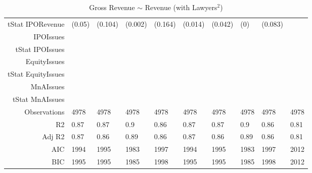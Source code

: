 \begin{table}[ht]
\begin{tabular}{rlllllllll}
  tStat IPORevenue & (0.05) & (0.104) & (0.002) & (0.164) & (0.014) & (0.042) & (0) & (0.083) &  \\ 
  IPOIssues &  &  &  &  &  &  &  &  &  \\ 
  tStat IPOIssues &  &  &  &  &  &  &  &  &  \\ 
  EquityIssues &  &  &  &  &  &  &  &  &  \\ 
  tStat EquityIssues &  &  &  &  &  &  &  &  &  \\ 
  MnAIssues &  &  &  &  &  &  &  &  &  \\ 
  tStat MnAIssues &  &  &  &  &  &  &  &  &  \\ 
  Observations & 4978 & 4978 & 4978 & 4978 & 4978 & 4978 & 4978 & 4978 & 4978 \\ 
  R2 & 0.87 & 0.87 & 0.9 & 0.86 & 0.87 & 0.87 & 0.9 & 0.86 & 0.81 \\ 
  Adj R2 & 0.87 & 0.86 & 0.89 & 0.86 & 0.87 & 0.86 & 0.89 & 0.86 & 0.81 \\ 
  AIC & 1994 & 1995 & 1983 & 1997 & 1994 & 1995 & 1983 & 1997 & 2012 \\ 
  BIC & 1995 & 1995 & 1985 & 1998 & 1995 & 1995 & 1985 & 1998 & 2012 \\ 
   \hline
\end{tabular}
\caption{Gross Revenue $\sim$ Revenue (with Lawyers$^2$)} 
\end{table}
